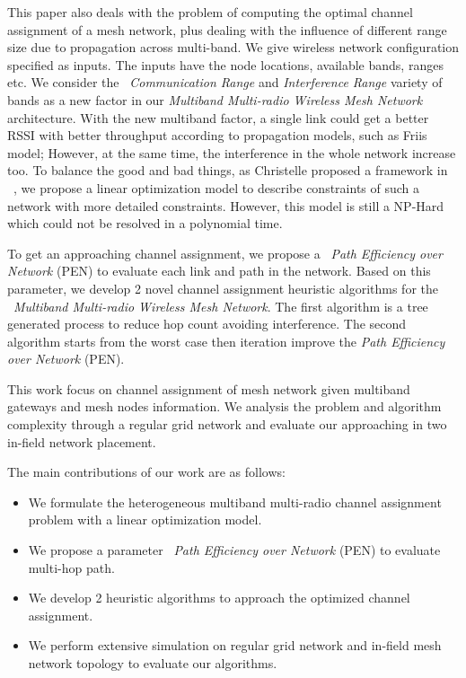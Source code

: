 This paper also deals with the problem of computing the optimal channel assignment of a mesh network, plus dealing with the influence of different range size due to propagation across multi-band. 
We give wireless network configuration specified as inputs. 
The inputs have the node locations, available bands, ranges etc. We consider the ~\emph{Communication Range} and \emph{Interference Range} variety of bands as a new factor in our \emph{Multiband Multi-radio Wireless Mesh Network} architecture.  
With the new multiband factor, a single link could get a better RSSI with better throughput according to propagation models, such as Friis model; However, at the same time, the interference in the whole network increase too. 
To balance the good and bad things, as Christelle proposed a framework in ~\cite{yuan2006cross}, we propose a linear optimization model to describe constraints of such a network with more detailed constraints. However, this model is still a NP-Hard which could not be resolved in a polynomial time. 

To get an approaching channel assignment, we propose a ~\emph{Path Efficiency over Network} (PEN) to evaluate each link and path in the network. Based on this parameter, we develop 2 novel channel assignment heuristic algorithms for the ~\emph{Multiband Multi-radio Wireless Mesh Network}. The first algorithm is a tree generated process to reduce hop count avoiding interference. The second algorithm starts from the worst case then iteration improve the \emph{Path Efficiency over Network} (PEN).

This work focus on channel assignment of mesh network given multiband gateways and mesh nodes information.
We analysis the problem and algorithm complexity through a regular grid network and evaluate our approaching in two in-field network placement. 

% 
The main contributions of our work are as follows:
\begin{itemize}
\item We formulate the heterogeneous multiband multi-radio channel assignment problem with a linear optimization model.  

\item We propose a parameter ~\emph{Path Efficiency over Network} (PEN) to evaluate multi-hop path.

\item We develop 2 heuristic algorithms to approach the optimized channel assignment.

\item We perform extensive simulation on regular grid network and in-field mesh network topology to evaluate our algorithms.


\end{itemize}

